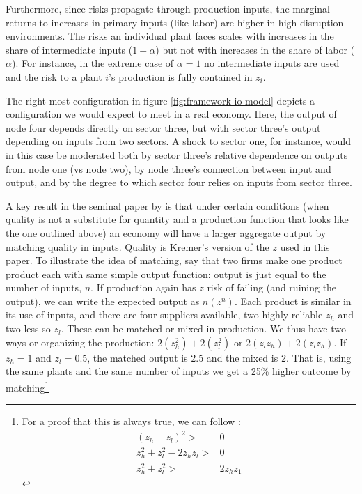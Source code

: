 \documentclass[11pt]{article}
\begin{document}
Furthermore, since risks propagate through production inputs, the marginal returns to increases in primary inputs (like labor) are higher in high-disruption environments. The risks an individual plant faces scales with increases in the share of intermediate inputs (\(1 - \alpha\)) but not with increases in the share of labor (\(\alpha\)). For instance, in the extreme case of \(\alpha = 1\) no intermediate inputs are used and the risk to a plant \(i\)'s production is fully contained in \(z_i\). 

The right most configuration in figure \ref{fig:framework-io-model} depicts a configuration we would expect to meet in a real economy. Here, the output of node four depends directly on sector three, but with sector three's output depending on inputs from two sectors. A shock to sector one, for instance, would in this case be moderated both by sector three's relative dependence on outputs from node one (vs node two), by node three's connection between input and output, and by the degree to which sector four relies on inputs from sector three.

A key result in the seminal paper by \cite{kremer_o-ring_1993} is that under certain conditions (when quality is not a substitute for quantity and a production function that looks like the one outlined above) an economy will have a larger aggregate output by matching quality in inputs. Quality is Kremer's version of the \(z\) used in this paper. To illustrate the idea of matching, say that two firms make one product product each with same simple output function: output is just equal to the number of inputs, $n$. If production again has $z$ risk of failing (and ruining the output), we can write the expected output as $n(z^n)$. Each product is similar in its use of inputs, and there are four suppliers available, two highly reliable \(z_{h}\) and two less so \(z_{l}\). These can be matched or mixed in production. We thus have two ways or organizing the production: $2(z_h^2) + 2(z_l^2)$ or $2(z_l z_h) + 2(z_l z_h)$. If $z_h = 1$ and $z_l = 0.5$, the matched output is 2.5 and the mixed is 2. That is, using the same plants and the same number of inputs we get a 25\% higher outcome by matching\footnote{For a proof that this is always true, we can follow \cite{kremer_o-ring_1993}:
\begin{align*}
	(z_h - z_l)^2 >& 0 \\  z_h^2 + z_l^2 - 2z_h z_l >& 0 \\ z_h^2 + z_l^2 >& 2z_h z_1
\end{align*}}
\end{document}
